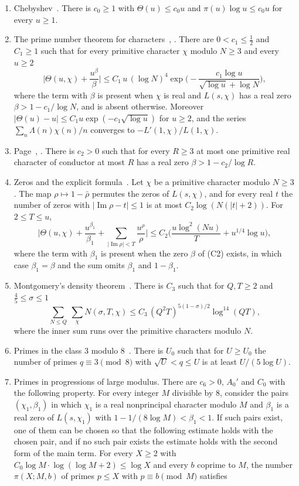 \begin{enumerate}
\item[(C1)] Chebyshev~\cite{chebyshev}. There is $c_0\ge1$ with $\Theta(u)\le c_0u$ and $\pi(u)\log u\le c_0u$ for every $u\ge1$.
\item[(C2)] The prime number theorem for characters~\cite[Theorem~5.27]{ik}, \cite[Ch.~20]{davenport}. There are $0<c_1\le\frac12$ and $C_1\ge1$ such that for every primitive character $\chi$ modulo $N\ge3$ and every $u\ge2$
\[
\Big\lvert\Theta(u,\chi)+\frac{u^{\beta}}{\beta}\Big\rvert\le C_1\,u\,(\log N)^4\exp\Big(-\frac{c_1\log u}{\sqrt{\log u}+\log N}\Big),
\]
where the term with $\beta$ is present when $\chi$ is real and $L(s,\chi)$ has a real zero $\beta>1-c_1/\log N$, and is absent otherwise. Moreover $\lvert\Theta(u)-u\rvert\le C_1u\exp(-c_1\sqrt{\log u})$ for $u\ge2$, and the series $\sum_n\Lambda(n)\chi(n)/n$ converges to $-L'(1,\chi)/L(1,\chi)$.
\item[(C3)] Page~\cite{page}, \cite[Ch.~14]{davenport}. There is $c_2>0$ such that for every $R\ge3$ at most one primitive real character of conductor at most $R$ has a real zero $\beta>1-c_2/\log R$.
\item[(C4)] Zeros and the explicit formula~\cite[Ch.~16 and~19]{davenport}. Let $\chi$ be a primitive character modulo $N\ge3$. The map $\rho\mapsto1-\bar\rho$ permutes the zeros of $L(s,\chi)$, and for every real $t$ the number of zeros with $\lvert\operatorname{Im}\rho-t\rvert\le1$ is at most $C_2\log(N(\lvert t\rvert+2))$. For $2\le T\le u$,
\[
\Big\lvert\Theta(u,\chi)+\frac{u^{\beta_1}}{\beta_1}+\sum_{\lvert\operatorname{Im}\rho\rvert<T}\frac{u^\rho}{\rho}\Big\rvert\le C_2\Big(\frac{u\log^2(Nu)}T+u^{1/4}\log u\Big),
\]
where the term with $\beta_1$ is present when the zero $\beta$ of (C2) exists, in which case $\beta_1=\beta$ and the sum omits $\beta_1$ and $1-\beta_1$.
\item[(C5)] Montgomery's density theorem~\cite[Theorem~12.2]{montgomerytopics}. There is $C_3$ such that for $Q,T\ge2$ and $\frac45\le\sigma\le1$
\[
\sum_{N\le Q}\ \sum_{\chi}N(\sigma,T,\chi)\le C_3\,(Q^2T)^{5(1-\sigma)/2}\log^{14}(QT),
\]
where the inner sum runs over the primitive characters modulo $N$.
\item[(C6)] Primes in the class $3$ modulo $8$~\cite[Ch.~20]{davenport}. There is $U_0$ such that for $U\ge U_0$ the number of primes $q\equiv3\pmod8$ with $\sqrt U<q\le U$ is at least $U/(5\log U)$.
\item[(C7)] Primes in progressions of large modulus. There are $c_6>0$, $A_0'$ and $C_0$ with the following property. For every integer $M$ divisible by $8$, consider the pairs $(\chi_1,\beta_1)$ in which $\chi_1$ is a real nonprincipal character modulo $M$ and $\beta_1$ is a real zero of $L(s,\chi_1)$ with $1-1/(8\log M)<\beta_1<1$. If such pairs exist, one of them can be chosen so that the following estimate holds with the chosen pair, and if no such pair exists the estimate holds with the second form of the main term. For every $X\ge2$ with $C_0\log M\cdot\log(\log M+2)\le\log X$ and every $b$ coprime to $M$, the number $\pi(X;M,b)$ of primes $p\le X$ with $p\equiv b\pmod M$ satisfies

\end{enumerate}
